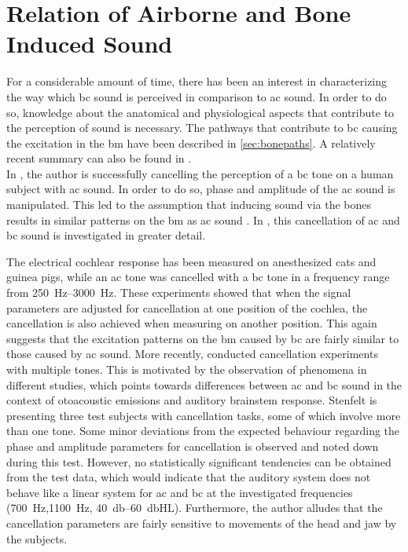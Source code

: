 \section{Relation of Airborne and Bone Induced Sound}
For a considerable amount of time, there has been an interest in characterizing the way which \gls{bc} sound is perceived in comparison to \gls{ac} sound. In order to do so, knowledge about the anatomical and physiological aspects that contribute to the perception of sound is necessary.
The pathways that contribute to \gls{bc} causing the excitation in the \gls{bm} have been described in \ref{sec:bonepaths}. A relatively recent summary can also be found in \citep{dauman_2013}.\\
In \citep{bekesy_1932}, the author is successfully cancelling the perception of a \gls{bc} tone on a human subject with \gls{ac} sound. In order to do so, phase and amplitude of the \gls{ac} sound is manipulated. This led to the assumption that inducing sound via the bones results in similar patterns on the \gls{bm} as \gls{ac} sound \citep{stenfelt_2007}.
In \citep{lowy_1942}, this cancellation of \gls{ac} and \gls{bc} sound is investigated in greater detail. 

The electrical cochlear response has been measured on anesthesized cats and guinea pigs, while an \gls{ac} tone was cancelled with a \gls{bc} tone in a frequency range from \SIrange{250}{3000}{\hertz}. These experiments showed that when the signal parameters are adjusted for cancellation at one position of the cochlea, the cancellation is also achieved when measuring on another position. This again suggests that the excitation patterns on the \gls{bm} caused by \gls{bc} are fairly similar to those caused by \gls{ac} sound. More recently, \citep{stenfelt_2007} conducted cancellation experiments with multiple tones. This is motivated by the observation of phenomena in different studies, which points towards differences between \gls{ac} and \gls{bc} sound in the context of otoacoustic emissions and auditory brainstem response. 
Stenfelt \citep{stenfelt_2007} is presenting three test subjects with cancellation tasks, some of which involve more than one tone. Some minor deviations from the expected behaviour regarding the phase and amplitude parameters for cancellation is observed and noted down during this test. However, no statistically significant tendencies can be obtained from the test data, which would indicate that the auditory system does not behave like a linear system for \gls{ac} and \gls{bc} at the investigated frequencies (\SI{700}{\hertz},\SI{1100}{\hertz}, \SIrange{40}{60}{\decibel}HL).
Furthermore, the author alludes that the cancellation parameters are fairly sensitive to movements of the head and jaw by the subjects. 